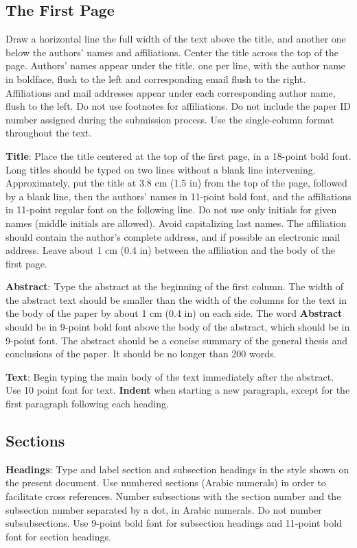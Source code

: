 \documentclass[]{article}
\begin{document}
\subsection{The First Page}
\label{ssec:first}

Draw a horizontal line the full width of the text above the title, and
another one below the authors' names and affiliations.  Center the
title across the top of the page. Authors' names appear under the
title, one per line, with the author name in boldface, flush to the
left and corresponding email flush to the right.  Affiliations and
mail addresses appear under each corresponding author name, flush to
the left. Do not use footnotes for affiliations. Do not include the
paper ID number assigned during the submission process. Use the
single-column format throughout the text.

{\bf Title}: Place the title centered at the top of the first page, in
a 18-point bold font. Long titles should be typed on two lines without
a blank line intervening. Approximately, put the title at 3.8 cm (1.5
in) from the top of the page, followed by a blank line, then the
authors' names in 11-point bold font, and the affiliations in 11-point
regular font on the following line. Do not use only initials for given
names (middle initials are allowed). Avoid capitalizing last
names. The affiliation should contain the author's complete address,
and if possible an electronic mail address. Leave about 1 cm (0.4 in)
between the affiliation and the body of the first page.

{\bf Abstract}: Type the abstract at the beginning of the first
column. The width of the abstract text should be smaller than the
width of the columns for the text in the body of the paper by about 1
cm (0.4 in) on each side. The word {\bf Abstract} should be in 9-point
bold font above the body of the abstract, which should be in 9-point
font. The abstract should be a concise summary of the general thesis
and conclusions of the paper. It should be no longer than 200 words.

{\bf Text}: Begin typing the main body of the text immediately after
the abstract. Use 10 point font for text. {\bf Indent} when starting a
new paragraph, except for the first paragraph following each heading.


\subsection{Sections}

{\bf Headings}: Type and label section and subsection headings in the
style shown on the present document.  Use numbered sections (Arabic
numerals) in order to facilitate cross references. Number subsections
with the section number and the subsection number separated by a dot,
in Arabic numerals. Do not number subsubsections. Use 9-point bold
font for subsection headings and 11-point bold font for section
headings.
\end{document}
